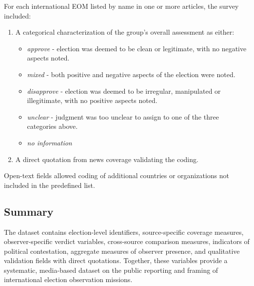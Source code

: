 \documentclass[USletter,12pt, titlepage]{article} %
\begin{document}
For each international EOM listed by name in one or more articles, the survey included:

\begin{enumerate}
    \item A categorical characterization of the group’s overall assessment as either: 
    \begin{itemize}
    \item \textit{approve} - election was deemed to be clean or legitimate, with no negative aspects noted.
    \item \textit{mixed} - both positive and negative aspects of the election were noted.
    \item \textit{disapprove} - election was deemed to be irregular, manipulated or illegitimate, with no positive aspects noted. 
    \item \textit{unclear} - judgment was too unclear to assign to one of the three categories above. 
    \item \textit{no information}
    \end{itemize}
    
    \item A direct quotation from news coverage validating the coding.
\end{enumerate}

Open-text fields allowed coding of additional countries or organizations not included in the predefined list.


\subsection{Summary}

The dataset contains election-level identifiers, source-specific coverage measures, observer-specific verdict variables, cross-source comparison measures, indicators of political contestation, aggregate measures of observer presence, and qualitative validation fields with direct quotations. Together, these variables provide a systematic, media-based dataset on the public reporting and framing of international election observation missions.

\newpage
\end{document}
